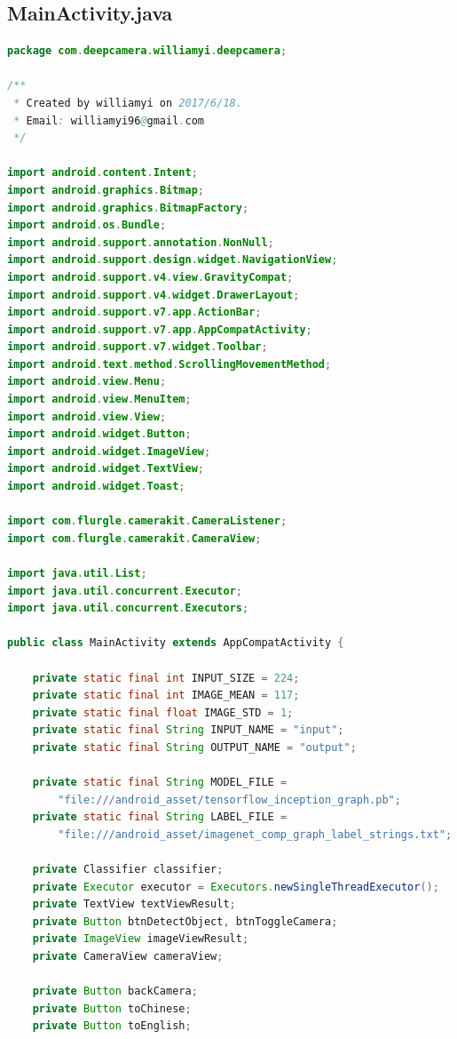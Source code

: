 \documentclass[UTF8, Microsoft YaHei]{book}
\begin{document}
    \subsection{MainActivity.java}
\begin{small}
\begin{lstlisting}[language=java]
package com.deepcamera.williamyi.deepcamera;

/**
 * Created by williamyi on 2017/6/18.
 * Email: williamyi96@gmail.com
 */

import android.content.Intent;
import android.graphics.Bitmap;
import android.graphics.BitmapFactory;
import android.os.Bundle;
import android.support.annotation.NonNull;
import android.support.design.widget.NavigationView;
import android.support.v4.view.GravityCompat;
import android.support.v4.widget.DrawerLayout;
import android.support.v7.app.ActionBar;
import android.support.v7.app.AppCompatActivity;
import android.support.v7.widget.Toolbar;
import android.text.method.ScrollingMovementMethod;
import android.view.Menu;
import android.view.MenuItem;
import android.view.View;
import android.widget.Button;
import android.widget.ImageView;
import android.widget.TextView;
import android.widget.Toast;

import com.flurgle.camerakit.CameraListener;
import com.flurgle.camerakit.CameraView;

import java.util.List;
import java.util.concurrent.Executor;
import java.util.concurrent.Executors;

public class MainActivity extends AppCompatActivity {

    private static final int INPUT_SIZE = 224;
    private static final int IMAGE_MEAN = 117;
    private static final float IMAGE_STD = 1;
    private static final String INPUT_NAME = "input";
    private static final String OUTPUT_NAME = "output";

    private static final String MODEL_FILE =
    	"file:///android_asset/tensorflow_inception_graph.pb";
    private static final String LABEL_FILE =
        "file:///android_asset/imagenet_comp_graph_label_strings.txt";

    private Classifier classifier;
    private Executor executor = Executors.newSingleThreadExecutor();
    private TextView textViewResult;
    private Button btnDetectObject, btnToggleCamera;
    private ImageView imageViewResult;
    private CameraView cameraView;

    private Button backCamera;
    private Button toChinese;
    private Button toEnglish;


\end{lstlisting}
\end{small}
\end{document}

